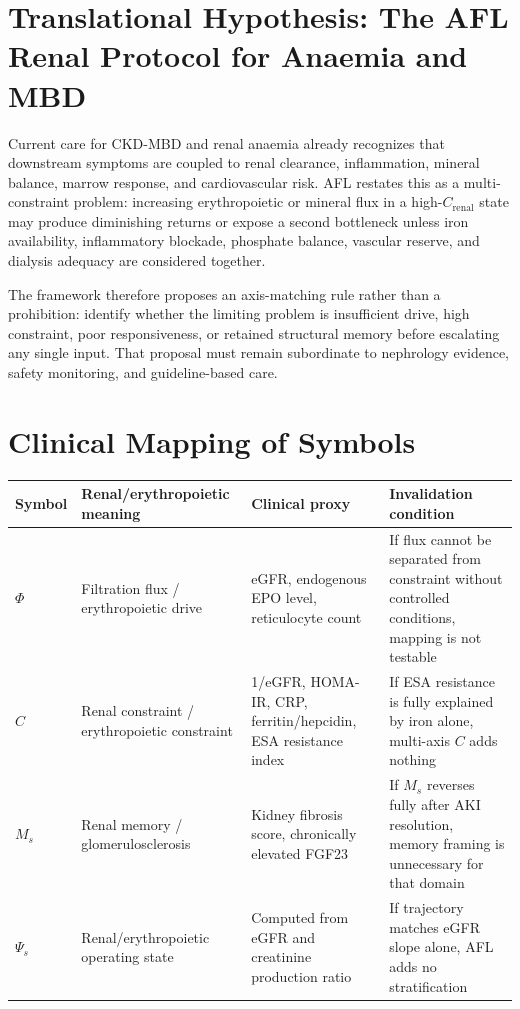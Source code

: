 \documentclass[12pt,a4paper]{article}
\begin{document}
\section{Translational Hypothesis: The AFL Renal Protocol for Anaemia and MBD}
Current care for CKD-MBD and renal anaemia already recognizes that downstream symptoms are coupled to renal clearance, inflammation, mineral balance, marrow response, and cardiovascular risk. AFL restates this as a multi-constraint problem: increasing erythropoietic or mineral flux in a high-$C_{\mathrm{renal}}$ state may produce diminishing returns or expose a second bottleneck unless iron availability, inflammatory blockade, phosphate balance, vascular reserve, and dialysis adequacy are considered together.

The framework therefore proposes an axis-matching rule rather than a prohibition: identify whether the limiting problem is insufficient drive, high constraint, poor responsiveness, or retained structural memory before escalating any single input. That proposal must remain subordinate to nephrology evidence, safety monitoring, and guideline-based care.

\section{Clinical Mapping of Symbols}

\begin{center}
\begin{tabular}{p{1.5cm}p{3.0cm}p{3.5cm}p{4.5cm}}
\toprule
Symbol & Renal/erythropoietic meaning & Clinical proxy & Invalidation condition \\
\midrule
$\Phi$ & Filtration flux / erythropoietic drive & eGFR, endogenous EPO level, reticulocyte count & If flux cannot be separated from constraint without controlled conditions, mapping is not testable \\
$C$ & Renal constraint / erythropoietic constraint & 1/eGFR, HOMA-IR, CRP, ferritin/hepcidin, ESA resistance index & If ESA resistance is fully explained by iron alone, multi-axis $C$ adds nothing \\
$M_s$ & Renal memory / glomerulosclerosis & Kidney fibrosis score, chronically elevated FGF23 & If $M_s$ reverses fully after AKI resolution, memory framing is unnecessary for that domain \\
$\Psi_s$ & Renal/erythropoietic operating state & Computed from eGFR and creatinine production ratio & If trajectory matches eGFR slope alone, AFL adds no stratification \\
\bottomrule
\end{tabular}
\end{center}
\end{document}
